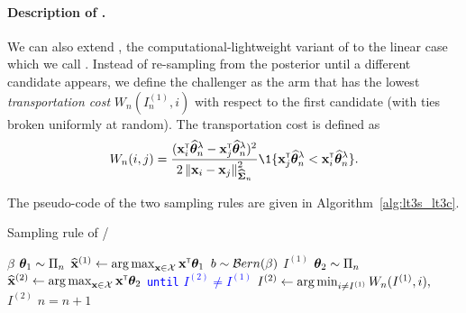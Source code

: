\paragraph{Description of \LTCC{}.} We can also extend \TCC{}, the computational-lightweight variant of \TTTS{} to the linear case which we call \LTCC{}. Instead of re-sampling from the posterior until a different candidate appears, we define the challenger as the arm that has the lowest \emph{transportation cost} $W_n(I_n^{(1)},i)$ with respect to the first candidate (with ties broken uniformly at random). The transportation cost is defined as
\begin{align}\label{def:transportation}
    W_n(i,j) = \dfrac{(\bx_i\transpose\hat{\btheta}^\lambda_n-\bx_j\transpose\hat{\btheta}^\lambda_n)^2}{2\normm{\bx_i-\bx_j}_{\hat{\bSigma}_n}^2}\1\{\bx_j\transpose\hat{\btheta}^\lambda_n<\bx_i\transpose\hat{\btheta}^\lambda_n\}.
\end{align}

The pseudo-code of the two sampling rules are given in Algorithm~\ref{alg:lt3s_lt3c}.

\begin{algorithm}[ht]
\centering
\caption{Sampling rule of \LTCS{}/\LTCC{}}
\label{alg:lt3s_lt3c}
\begin{algorithmic}[1]
    $\beta$ %
        \State {} ${\boldsymbol \theta}_1 \sim \Pi_n$
        \State $\widehat{{\bf x}}^{(1)} \leftarrow \operatorname*{arg\,max}_{{\bf x}\in\mathcal{X}} {\bf x}^\mathsf{\scriptscriptstyle T}{\boldsymbol \theta}_1$ 
	    \State {} $b \sim \mathcal{B} ern(\beta)$
	        \State {} $I^{(1)}$
	    \Else
	        \State \textcolor{blue}{ ${\boldsymbol \theta}_2 \sim \Pi_n$}%
            \State \textcolor{blue}{$\widehat{{\bf x}}^{(2)} \leftarrow \operatorname*{arg\,max}_{{\bf x}\in\mathcal{X}} {\bf x}^\mathsf{\scriptscriptstyle T}{\boldsymbol \theta}_2$ }\Comment{\textcolor{blue}{\LTCS}}
	        \State \textcolor{blue}{\texttt{until} $I^{(2)} \neq I^{(1)}$}%
	        \State \textcolor{red}{$I^{(2)} \leftarrow \operatorname*{arg\,min}_{i\neq I^{(1)}}W_n(I^{(1)},i), $ }\Comment{\textcolor{red}{\LTCC}}%
		    \State {} $I^{(2)}$
	    \EndIf
	    \State {}
	    \State $n = n+1$
   \EndFor
\end{algorithmic}
\end{algorithm}

